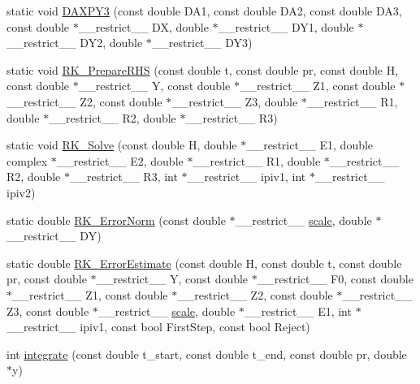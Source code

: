 \begin{DoxyCompactItemize}
\item 
static void \hyperlink{namespaceradau2a_accc366d693bc987d4e9f3e5fcc5721b1}{D\+A\+X\+P\+Y3} (const double D\+A1, const double D\+A2, const double D\+A3, const double $\ast$\+\_\+\+\_\+restrict\+\_\+\+\_\+ DX, double $\ast$\+\_\+\+\_\+restrict\+\_\+\+\_\+ D\+Y1, double $\ast$\+\_\+\+\_\+restrict\+\_\+\+\_\+ D\+Y2, double $\ast$\+\_\+\+\_\+restrict\+\_\+\+\_\+ D\+Y3)
\item 
static void \hyperlink{namespaceradau2a_af5bc219a47482e040d93186def505f01}{R\+K\+\_\+\+Prepare\+R\+HS} (const double t, const double pr, const double H, const double $\ast$\+\_\+\+\_\+restrict\+\_\+\+\_\+ Y, const double $\ast$\+\_\+\+\_\+restrict\+\_\+\+\_\+ Z1, const double $\ast$\+\_\+\+\_\+restrict\+\_\+\+\_\+ Z2, const double $\ast$\+\_\+\+\_\+restrict\+\_\+\+\_\+ Z3, double $\ast$\+\_\+\+\_\+restrict\+\_\+\+\_\+ R1, double $\ast$\+\_\+\+\_\+restrict\+\_\+\+\_\+ R2, double $\ast$\+\_\+\+\_\+restrict\+\_\+\+\_\+ R3)
\item 
static void \hyperlink{namespaceradau2a_ab9dfab43bd32440af1158bad0d91ade3}{R\+K\+\_\+\+Solve} (const double H, double $\ast$\+\_\+\+\_\+restrict\+\_\+\+\_\+ E1, double complex $\ast$\+\_\+\+\_\+restrict\+\_\+\+\_\+ E2, double $\ast$\+\_\+\+\_\+restrict\+\_\+\+\_\+ R1, double $\ast$\+\_\+\+\_\+restrict\+\_\+\+\_\+ R2, double $\ast$\+\_\+\+\_\+restrict\+\_\+\+\_\+ R3, int $\ast$\+\_\+\+\_\+restrict\+\_\+\+\_\+ ipiv1, int $\ast$\+\_\+\+\_\+restrict\+\_\+\+\_\+ ipiv2)
\item 
static double \hyperlink{namespaceradau2a_a3218b6d64f48cecafb78c71318c1ee9b}{R\+K\+\_\+\+Error\+Norm} (const double $\ast$\+\_\+\+\_\+restrict\+\_\+\+\_\+ \hyperlink{namespaceradau2a_ad92aba1b979853cd2b6102916a402904}{scale}, double $\ast$\+\_\+\+\_\+restrict\+\_\+\+\_\+ DY)
\item 
static double \hyperlink{namespaceradau2a_ac00b7bbdb38b0af9ab59a19bc1f5b3f9}{R\+K\+\_\+\+Error\+Estimate} (const double H, const double t, const double pr, const double $\ast$\+\_\+\+\_\+restrict\+\_\+\+\_\+ Y, const double $\ast$\+\_\+\+\_\+restrict\+\_\+\+\_\+ F0, const double $\ast$\+\_\+\+\_\+restrict\+\_\+\+\_\+ Z1, const double $\ast$\+\_\+\+\_\+restrict\+\_\+\+\_\+ Z2, const double $\ast$\+\_\+\+\_\+restrict\+\_\+\+\_\+ Z3, const double $\ast$\+\_\+\+\_\+restrict\+\_\+\+\_\+ \hyperlink{namespaceradau2a_ad92aba1b979853cd2b6102916a402904}{scale}, double $\ast$\+\_\+\+\_\+restrict\+\_\+\+\_\+ E1, int $\ast$\+\_\+\+\_\+restrict\+\_\+\+\_\+ ipiv1, const bool First\+Step, const bool Reject)
\item 
int \hyperlink{namespaceradau2a_a978f385afc7643435035b4b4f198dc77}{integrate} (const double t\+\_\+start, const double t\+\_\+end, const double pr, double $\ast$y)
\end{DoxyCompactItemize}
